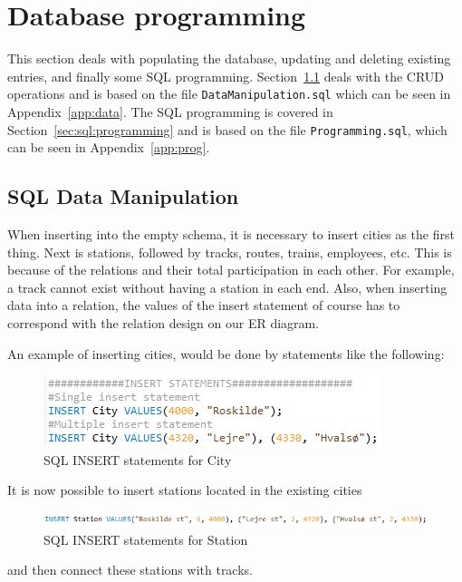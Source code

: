 \section{Database programming}\label{sec:prog}
This section deals with populating the database, updating and deleting existing 
entries, and finally some SQL programming. Section~\ref{sec:manipulate} deals 
with the CRUD operations and is based on the file \verb|DataManipulation.sql| 
which can be seen in Appendix~\ref{app:data}. The SQL programming is covered in 
Section~\ref{sec:sql:programming} and is based on the file 
\verb|Programming.sql|, which can be seen in Appendix~\ref{app:prog}.

\subsection{SQL Data Manipulation} \label{sec:manipulate}
When inserting into the empty schema, it is necessary to insert cities as the 
first thing. Next is stations, followed by tracks, routes, trains, employees, 
etc. This is because of the relations and their total participation in each 
other. For example, a track cannot exist without having a station in each 
end.
Also, when inserting data into a relation, the values of the insert statement 
of course has to correspond with the relation design on our ER diagram.

An example of inserting cities, would be done by statements like the following:

\begin{figure}[ht!]
    \centering
    \includegraphics[width=.6\textwidth]{img/INSERT_Statements}
    \caption{SQL INSERT statements for City}
\end{figure}

It is now possible to insert stations located in the existing cities

\begin{figure}[ht!]
    \centering
    \includegraphics[width=1\textwidth]{img/INSERT_Statement_Station}
    \caption{SQL INSERT statements for Station}
\end{figure}

and then connect these stations with tracks.


